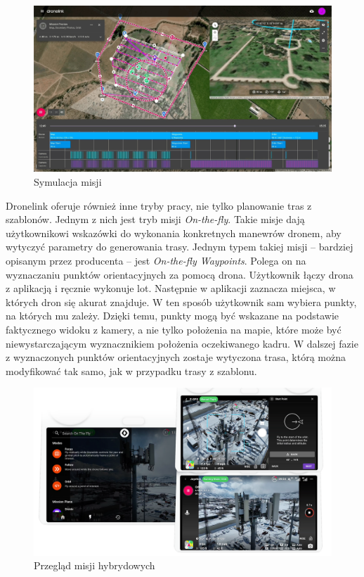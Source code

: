 \begin{figure}[H]
    \centering
    \includegraphics[width=\textwidth]{images/Dronelink_symulacja.jpg}
    \caption{Symulacja misji}
\end{figure}

Dronelink oferuje również inne tryby pracy, nie tylko planowanie tras z szablonów. Jednym z nich jest tryb misji \textit{On-the-fly}. Takie misje dają użytkownikowi wskazówki do wykonania konkretnych manewrów dronem, aby wytyczyć parametry do generowania trasy. Jednym typem takiej misji – bardziej opisanym przez producenta – jest \textit{On-the-fly Waypoints}. Polega on na wyznaczaniu punktów orientacyjnych za pomocą drona. Użytkownik łączy drona z aplikacją i ręcznie wykonuje lot. Następnie w aplikacji zaznacza miejsca, w których dron się akurat znajduje. W ten sposób użytkownik sam wybiera punkty, na których mu zależy. Dzięki temu, punkty mogą być wskazane na podstawie faktycznego widoku z kamery, a nie tylko położenia na mapie, które może być niewystarczającym wyznacznikiem położenia oczekiwanego kadru. W dalszej fazie z wyznaczonych punktów orientacyjnych zostaje wytyczona trasa, którą można modyfikować tak samo, jak w przypadku trasy z szablonu.

\begin{figure}[H]
    \centering
    \includegraphics[width=\textwidth]{images/Dronelink_misje_hybrydowe.png}
    \caption{Przegląd misji hybrydowych}
\end{figure}

